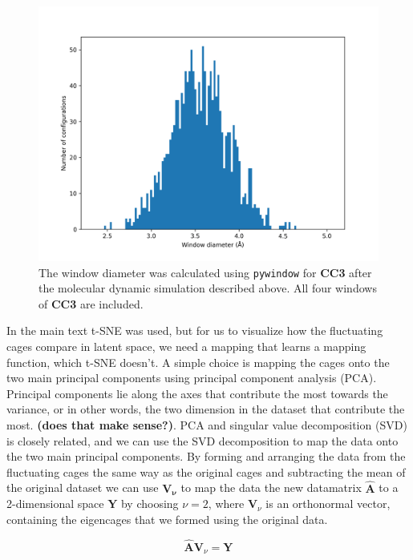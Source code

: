 \documentclass[journal=jacsat,manuscript=article]{achemso}
\begin{document}
\begin{figure}
\centering
	\includegraphics[width=0.65\columnwidth]{../cc3_histogram.png}
	\caption{The window diameter was calculated using \texttt{pywindow} for \textbf{CC3} after the molecular dynamic simulation described above. All four windows of \textbf{CC3} are included.
	} \label{fig:window_diameter_hist}
\end{figure}

In the main text t-SNE was used, but for us to visualize how the fluctuating cages compare in latent space, we need a mapping that learns a mapping function, which t-SNE doesn't. A simple choice is mapping the cages onto the two main principal components using principal component analysis (PCA). Principal components lie along the axes that contribute the most towards the variance, or in other words, the two dimension in the dataset that contribute the most. \textbf{(does that make sense?)}. PCA and singular value decomposition (SVD) is closely related, and we can use the SVD decomposition to map the data onto the two main principal components. By forming and arranging the data from the fluctuating cages the same way as the original cages and subtracting the mean of the original dataset we can use $\mathbf{V_\nu}$ to map the data the new datamatrix $\hat{\mathbf{A}}$ to a 2-dimensional space $\mathbf{Y}$ by choosing $\nu = 2$, where $\mathbf{V}_\nu$ is an orthonormal vector, containing the eigencages that we formed using the original data.

\begin{equation}
\hat{\mathbf{A}} \mathbf{V}_\nu = \mathbf{Y}
\label{eq:pca}
\end{equation}
\end{document}
